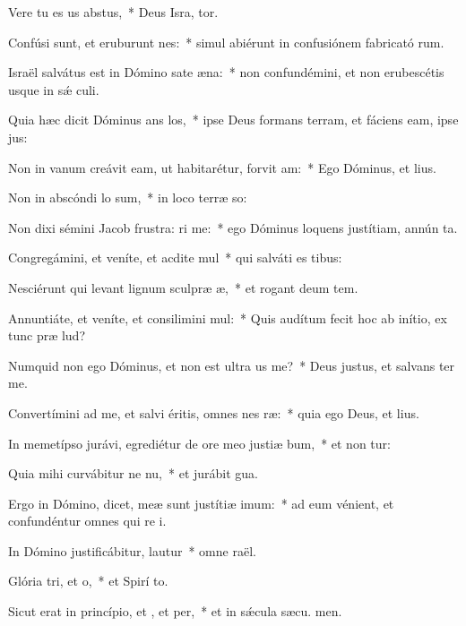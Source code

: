 \item Vere tu es us abstus,~* Deus Isra, tor.
\item Confúsi sunt, et eruburunt nes:~* simul abiérunt in confusiónem fabricató rum.
\item Israël salvátus est in Dómino sate æna:~* non confundémini, et non erubescétis usque in sǽ culi.
\item Quia hæc dicit Dóminus ans los,~* ipse Deus formans terram, et fáciens eam, ipse  jus:
\item Non in vanum creávit eam, ut habitarétur, forvit am:~* Ego Dóminus, et   lius.
\item Non in abscóndi lo sum,~* in loco terræ so:
\item Non dixi sémini Jacob frustra: ri me:~* ego Dóminus loquens justítiam, annún ta.
\item Congregámini, et veníte, et acdite mul~* qui salváti es  tibus:
\item Nesciérunt qui levant lignum sculpræ æ,~* et rogant deum  tem.
\item Annuntiáte, et veníte, et consilimini mul:~* Quis audítum fecit hoc ab inítio, ex tunc præ lud?
\item Numquid non ego Dóminus, et non est ultra us  me?~* Deus justus, et salvans   ter me.
\item Convertímini ad me, et salvi éritis, omnes nes ræ:~* quia ego Deus, et   lius.
\item In memetípso jurávi, egrediétur de ore meo justiæ bum,~* et non tur:
\item Quia mihi curvábitur ne nu,~* et jurábit  gua.
\item Ergo in Dómino, dicet, meæ sunt justítiæ  imum:~* ad eum vénient, et confundéntur omnes qui re i.
\item In Dómino justificábitur,  lautur~* omne  raël.
\item Glória tri, et o,~* et Spirí to.
\item Sicut erat in princípio, et , et per,~* et in sǽcula sæcu. men.
